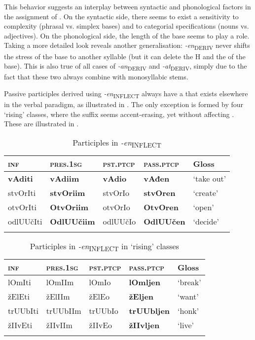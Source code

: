 \documentclass[output=paper, colorlinks, citecolor=brown, newtxmath]{langsci/langscibook}
\begin{document}
This behavior suggests an interplay between syntactic and phonological factors in the assignment of . On the syntactic side, there seems to exist a sensitivity to complexity (phrasal vs. simplex bases) and to categorial specifications (nouns vs. adjectives). On the phonological side, the length of the base seems to play a role. Taking a more detailed look reveals another generalisation: \textit{{-en}}\textsubscript{DERIV} never shifts the stress of the base to another syllable (but it can delete the H and the  of the base). This is also true of all cases of \textit{-an}\textsubscript{DERIV} and
\textit{-at}\textsubscript{DERIV}, simply due to the fact that these two always combine with monosyllabic stems.


\largerpage%
Passive participles derived using \textit{{-en}}\textsubscript{INFLECT} always have a  that exists elsewhere in the verbal paradigm, as illustrated in . The only exception is formed by four `rising' classes, where the suffix seems accent-erasing, yet without affecting . These are illustrated in .

\begin{table}
\caption{Participles in \textit{-en}\textsubscript{INFLECT}}
\label{tab10}
 \begin{tabular}{ l l l l l}
\lsptoprule
\textsc{inf}&\textsc{pres.1sg}&\textsc{pst.ptcp}&\textsc{pass.ptcp}& Gloss
\\
\midrule
\textbf{vAditi} & \textbf{vAdiim} & \textbf{vAdio} & \textbf{vAđen} & `take out' \\
stvOrIti & \textbf{stvOriim} & stvOrIo & \textbf{stvOren} & `create' \\
otvOrIti & \textbf{OtvOriim} & otvOrIo & \textbf{OtvOren} & `open' \\
odlUUčIti & \textbf{OdlUUčiim} & odlUUčIo & \textbf{OdlUUčen} & `decide'
\\
\lspbottomrule
 \end{tabular}
\end{table}


\begin{table}
\caption{Participles in \textit{-en}\textsubscript{INFLECT} in `rising' classes}
\label{tab11}
 \begin{tabular}{ l l l l l}
\lsptoprule
\textsc{inf}&\textsc{pres.1sg}&\textsc{pst.ptcp}&\textsc{pass.ptcp}& Gloss
\\
\midrule
lOmIti & lOmIIm & lOmIo & \textbf{lOmljen} & `break' \\
žElEti & žElIIm & žElEo & \textbf{žEljen} & `want'\\
trUUbIti & trUUbIIm & trUUbIo & \textbf{trUUbljen} & `honk'  \\
žIIvEti & žIIvIIm & žIIvEo & \textbf{žIIvljen} & `live'
\\
\lspbottomrule
 \end{tabular}
\end{table}
\end{document}
